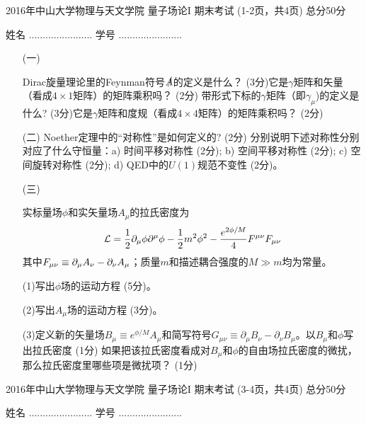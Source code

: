 \documentclass[12pt,CJK]{article}
\def\mark#1{{\color{blue} (#1分)}}
\begin{document}
\bch
{\large 2016年中山大学物理与天文学院 量子场论I 期末考试 (1-2页，共4页) 总分50分}

{\vskip 0.3in}

姓名 ....................... {\hskip 0.5in}    学号 .......................

{\vskip 0.1in}


\begin{itemize}
\item[(一)] {Dirac旋量理论里的Feynman符号$\slashed{A}$的定义是什么？\mark{3}它是$\gamma$矩阵和矢量（看成$4\times 1$矩阵）的矩阵乘积吗？ \mark{2} 带形式下标的$\gamma$矩阵（即$\gamma_\mu$)的定义是什么?\mark{3}它是$\gamma$矩阵和度规（看成$4\times4$矩阵）的矩阵乘积吗？\mark{2}

\vspace{4.2in}
}

\item[(二)]{Noether定理中的“对称性”是如何定义的? \mark{2} 分别说明下述对称性分别对应了什么守恒量：a) 时间平移对称性 \mark{2}; b) 空间平移对称性 \mark{2}; c) 空间旋转对称性 \mark{2}; d) QED中的$U(1)$规范不变性 \mark{2}。
}

\end{itemize}
\clearpage

\begin{itemize}
\item[(三)]{实标量场$\phi$和实矢量场$A_\mu$的拉氏密度为
$$ {\mathcal{L}} = \frac{1}{2}\partial_\mu\phi\partial^\mu\phi - \frac{1}{2}m^2\phi^2 - \frac{e^{2\phi/M}}{4}{F^{\mu\nu}}{F_{\mu\nu}}$$
其中${F_{\mu\nu}} \equiv \partial_\mu A_\nu - \partial_\nu A_\mu$；质量$m$和描述耦合强度的$M\gg m$均为常量。

(1)写出$\phi$场的运动方程 \mark{5}。

\vspace{1.7in}


(2)写出$A_\mu$场的运动方程 \mark{3}。

\vspace{2.1in}


(3)定义新的矢量场$B_\mu \equiv e^{\phi/M} A_\mu$和简写符号$G_{\mu\nu} \equiv \partial_\mu B_\nu -\partial_\nu B_\mu$。以$B_\mu$和$\phi$写出拉氏密度 \mark{1} 如果把该拉氏密度看成对$B_\mu$和$\phi$的自由场拉氏密度的微扰，那么拉氏密度里哪些项是微扰项？ \mark{1}
}
\end{itemize}
\clearpage

{\large 2016年中山大学物理与天文学院  量子场论I 期末考试 (3-4页，共4页) 总分50分}

{\vskip 0.3in}

姓名 ....................... {\hskip 0.5in}    学号 .......................
\end{document}
